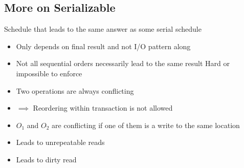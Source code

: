 \subsection{More on Serializable}
\begin{itemize}
     Schedule that leads to the same answer as some serial schedule
        \begin{itemize}
            \item Only depends on final result and not I/O pattern along 
            \item Not all sequential orders necessarily lead to the same result
            \icon Hard or impossible to enforce
        \end{itemize}
        \begin{itemize}
                \begin{itemize}
                        \begin{itemize}
                            \item Two operations are always conflicting
                            \item $\implies$ Reordering within transaction is not allowed
                        \end{itemize}
                        \begin{itemize}
                            \item $O_1$ and $O_2$ are conflicting if one of them is a write to the same location
                        \end{itemize}
                \end{itemize}
                \begin{itemize}
                        \begin{itemize}
                            \item Leads to unrepeatable reads
                        \end{itemize}
                        \begin{itemize}
                            \item Leads to dirty read
                        \end{itemize}
                        \begin{itemize}

\end{itemize}
\end{itemize}
\end{itemize}
\end{itemize}
